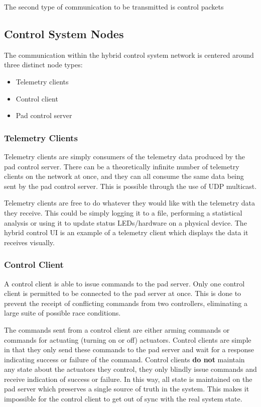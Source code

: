The second type of communication to be transmitted is control packets

\subsection{Control System Nodes}

The communication within the hybrid control system network is centered around three distinct node types:

\begin{itemize}
    \item Telemetry clients
    \item Control client
    \item Pad control server
\end{itemize}

\subsubsection{Telemetry Clients}

Telemetry clients are simply consumers of the telemetry data produced by the pad control server. There can be a theoretically infinite number of telemetry clients on the network at once, and they can all consume the same data being sent by the pad control server. This is possible through the use of UDP multicast.

Telemetry clients are free to do whatever they would like with the telemetry data they receive. This could be simply logging it to a file, performing a statistical analysis or using it to update status LEDs/hardware on a physical device. The hybrid control UI is an example of a telemetry client which displays the data it receives visually.

\subsubsection{Control Client}

A control client is able to issue commands to the pad server. Only one control client is permitted to be connected to the pad server at once. This is done to prevent the receipt of conflicting commands from two controllers, eliminating a large suite of possible race conditions.

The commands sent from a control client are either arming commands or commands for actuating (turning on or off) actuators. Control clients are simple in that they only send these commands to the pad server and wait for a response indicating success or failure of the command. Control clients \textbf{do not} maintain any state about the actuators they control, they only blindly issue commands and receive indication of success or failure. In this way, all state is maintained on the pad server which preserves a single source of truth in the system. This makes it impossible for the control client to get out of sync with the real system state.

